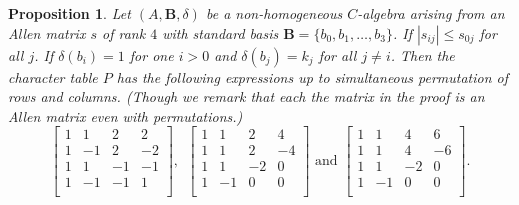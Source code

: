 \documentclass[12pt]{amsart}
\newtheorem{prop}[thm]{Proposition}
\begin{document}
\begin{prop}\label{CharacterTableExpreesionWithDifferentNormPropRank4} Let $(A,{{\mathbf B}}, \delta)$ be a non-homogeneous $C$-algebra arising from an Allen matrix $s$ of rank $4$ with standard  basis ${{\mathbf B}}=\{b_0,b_1,\hdots, b_3\}$. If $|s_{ij}|\leq s_{0j} $ for all $j$.  If $\delta(b_i)=1$ for one $i>0$ and $\delta(b_j)=k_j$ for all $j \neq i$.  Then the character table $P$ has the following expressions up to simultaneous permutation of rows and columns. (Though we remark that each the matrix in the proof is an Allen matrix even with permutations.)
$$\left[
   \begin{array}{cccc}
     1 & 1 & 2 &2\\
     1 & -1 &    2 &  -2\\
       1 &  1 &  -1&  -1\\
         1 & -1 &  -1&  1\\
   \end{array}\right], ~~\left[
   \begin{array}{cccc}
     1 & 1 & 2 &4\\
     1 &  1 &    2 &  -4\\
       1 &  1 &  -2&  0\\
         1 & -1 &  0& 0\\
   \end{array}\right]\mbox{ and } \left[
   \begin{array}{cccc}
     1 & 1 & 4 &6\\
     1 &  1 &   4 &  -6\\
       1 &  1 &  -2&  0\\
         1 & -1 &  0& 0\\
   \end{array}\right].$$
\end{prop}
\end{document}
